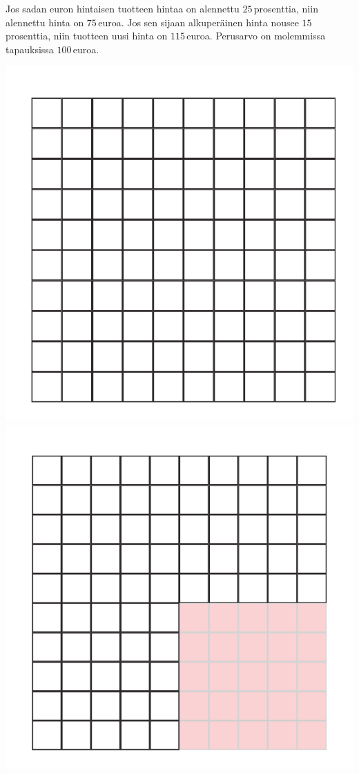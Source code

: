 
\begin{esimerkki}
    Jos sadan euron hintaisen tuotteen hintaa on alennettu $25$\,prosenttia,
    niin alennettu hinta on $75$\,euroa. Jos sen sijaan alkuperäinen
    hinta nousee $15$\,prosenttia, niin tuotteen uusi hinta on $115$\,euroa.
    Perusarvo on molemmissa tapauksissa $100$\,euroa.
    
    \begin{center}
        \includegraphics[scale=.25]{pictures/Kuva13-1-100.pdf}
        \includegraphics[scale=.25]{pictures/Kuva13-2-75.pdf}

\end{center}
\end{esimerkki}
